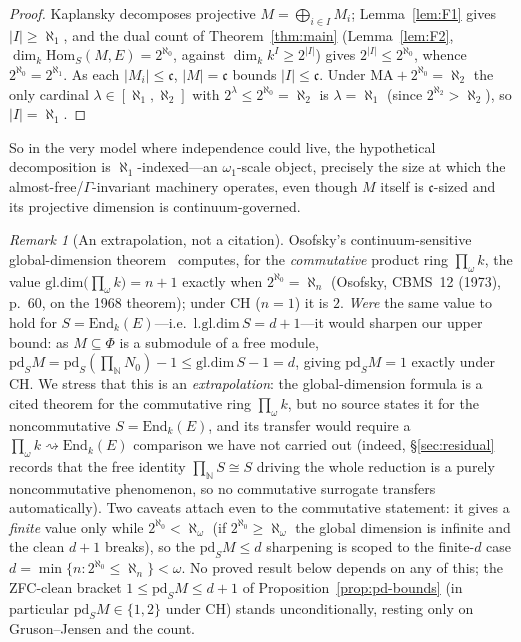 \documentclass[11pt,reqno]{amsart}
\theoremstyle{plain}
\theoremstyle{definition}
\theoremstyle{remark}
\newtheorem{remark}[theorem]{Remark}
\newcommand{\End}{\mathrm{End}}
\newcommand{\Hom}{\mathrm{Hom}}
\newcommand{\pd}{\mathrm{pd}}
\newcommand{\N}{\mathbb{N}}
\begin{document}
\begin{proof}
Kaplansky decomposes projective $M=\bigoplus_{i\in I}M_i$; Lemma~\ref{lem:F1} gives $|I|\ge\aleph_1$, and the dual count of Theorem~\ref{thm:main} (Lemma~\ref{lem:F2}, $\dim_k\Hom_S(M,E)=2^{\aleph_0}$, against $\dim_k k^{I}\ge2^{|I|}$) gives $2^{|I|}\le2^{\aleph_0}$, whence $2^{\aleph_0}=2^{\aleph_1}$. As each $|M_i|\le\mathfrak c$, $|M|=\mathfrak c$ bounds $|I|\le\mathfrak c$. Under $\mathrm{MA}+2^{\aleph_0}=\aleph_2$ the only cardinal $\lambda\in[\aleph_1,\aleph_2]$ with $2^{\lambda}\le2^{\aleph_0}=\aleph_2$ is $\lambda=\aleph_1$ (since $2^{\aleph_2}>\aleph_2$), so $|I|=\aleph_1$.
\end{proof}

So in the very model where independence could live, the hypothetical decomposition is $\aleph_1$-indexed---an $\omega_1$-scale object, precisely the size at which the almost-free/$\Gamma$-invariant machinery operates, even though $M$ itself is $\mathfrak c$-sized and its projective dimension is continuum-governed.

\begin{remark}[An extrapolation, not a citation]\label{rem:osofsky}
Osofsky's continuum-sensitive global-dimension theorem~\cite{osofsky} computes, for the \emph{commutative} product ring $\prod_{\omega}k$, the value $\mathrm{gl.dim}\bigl(\prod_{\omega}k\bigr)=n+1$ exactly when $2^{\aleph_0}=\aleph_n$ (Osofsky, CBMS~12 (1973), p.~60, on the 1968 theorem); under CH ($n=1$) it is $2$. \emph{Were} the same value to hold for $S=\End_k(E)$---i.e.\ $\mathrm{l.gl.dim}\,S=d+1$---it would sharpen our upper bound: as $M\subseteq\Phi$ is a submodule of a free module, $\pd_S M=\pd_S(\prod_{\N}N_0)-1\le\mathrm{gl.dim}\,S-1=d$, giving $\pd_S M=1$ exactly under CH. We stress that this is an \emph{extrapolation}: the global-dimension formula is a cited theorem for the commutative ring $\prod_{\omega}k$, but no source states it for the noncommutative $S=\End_k(E)$, and its transfer would require a $\prod_{\omega}k\rightsquigarrow\End_k(E)$ comparison we have not carried out (indeed, \S\ref{sec:residual} records that the free identity $\prod_{\N}S\cong S$ driving the whole reduction is a purely noncommutative phenomenon, so no commutative surrogate transfers automatically). Two caveats attach even to the commutative statement: it gives a \emph{finite} value only while $2^{\aleph_0}<\aleph_\omega$ (if $2^{\aleph_0}\ge\aleph_\omega$ the global dimension is infinite and the clean $d+1$ breaks), so the $\pd_S M\le d$ sharpening is scoped to the finite-$d$ case $d=\min\{n:2^{\aleph_0}\le\aleph_n\}<\omega$. No proved result below depends on any of this; the ZFC-clean bracket $1\le\pd_S M\le d+1$ of Proposition~\ref{prop:pd-bounds} (in particular $\pd_S M\in\{1,2\}$ under CH) stands unconditionally, resting only on Gruson--Jensen and the count.
\end{remark}
\end{document}
